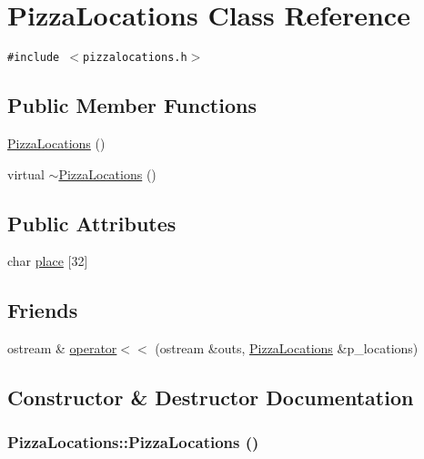 \hypertarget{class_pizza_locations}{
\section{Pizza\-Locations Class Reference}
\label{class_pizza_locations}
}
{\tt \#include $<$pizzalocations.h$>$}

\subsection*{Public Member Functions}
\begin{CompactItemize}
\item 
\hyperlink{class_pizza_locations_0d6e8ae796b74fb560a202c44b4685fe}{Pizza\-Locations} ()
\item 
virtual \hyperlink{class_pizza_locations_c0b369afc81c747d090da4b4d764fd58}{$\sim$Pizza\-Locations} ()
\end{CompactItemize}
\subsection*{Public Attributes}
\begin{CompactItemize}
\item 
char \hyperlink{class_pizza_locations_247f35efd255fe4af3b63f76e9c58b25}{place} \mbox{[}32\mbox{]}
\end{CompactItemize}
\subsection*{Friends}
\begin{CompactItemize}
\item 
ostream \& \hyperlink{class_pizza_locations_7a5ef62906b8b087fcc29903cd696ef0}{operator$<$$<$} (ostream \&outs, \hyperlink{class_pizza_locations}{Pizza\-Locations} \&p\_\-locations)
\end{CompactItemize}


\subsection{Constructor \& Destructor Documentation}
\hypertarget{class_pizza_locations_0d6e8ae796b74fb560a202c44b4685fe}{
\subsubsection[PizzaLocations]{\setlength{\rightskip}{0pt plus 5cm}Pizza\-Locations::Pizza\-Locations ()}}
\label{class_pizza_locations_0d6e8ae796b74fb560a202c44b4685fe}


